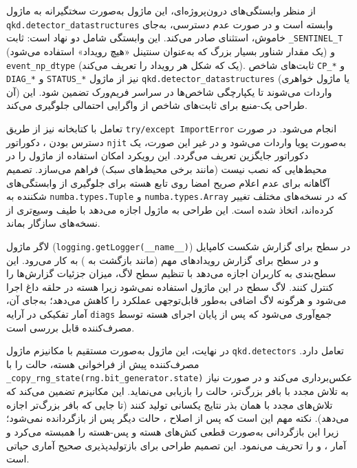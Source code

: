 از منظر وابستگی‌های درون‌پروژه‌ای، این ماژول به‌صورت سختگیرانه به ماژول \texttt{qkd.detector\_datastructures} وابسته است و در صورت عدم دسترسی، به‌جای  خاموش، استثنای  صادر می‌کند. این وابستگی شامل دو نهاد است: ثابت \texttt{\_SENTINEL\_T} (یک مقدار شناور بسیار بزرگ که به‌عنوان سنتینل «هیچ رویداد» استفاده می‌شود) و \texttt{event\_np\_dtype} (یک  که شکل هر رویداد را تعریف می‌کند). ثابت‌های شاخص \texttt{CP\_*} و \texttt{DIAG\_*} و \texttt{STATUS\_*} نیز از ماژول \texttt{qkd.detector\_datastructures} (یا ماژول خواهری آن) واردات می‌شوند تا یکپارچگی شاخص‌ها در سراسر فریم‌ورک تضمین شود. این طراحی یک-منبع  برای ثابت‌های شاخص از واگرایی احتمالی جلوگیری می‌کند.

تعامل با کتابخانه  نیز از طریق \texttt{try/except ImportError} انجام می‌شود. در صورت دسترس بودن ، دکوراتور \texttt{njit} به‌صورت پویا واردات می‌شود و در غیر این صورت، یک دکوراتور  جایگزین تعریف می‌گردد. این رویکرد امکان استفاده از ماژول را در محیط‌هایی که  نصب نیست (مانند برخی محیط‌های  سبک) فراهم می‌سازد. تصمیم آگاهانه برای عدم اعلام صریح امضا روی تابع هسته  برای جلوگیری از وابستگی‌های شکننده  به \texttt{numba.types.Tuple} و \texttt{numba.types.Array} که در نسخه‌های مختلف  تغییر کرده‌اند، اتخاذ شده است. این طراحی به ماژول اجازه می‌دهد با طیف وسیع‌تری از نسخه‌های  سازگار بماند.

لاگر ماژول (\texttt{logging.getLogger(\_\_name\_\_)}) در سطح  برای گزارش شکست کامپایل  و در سطح  برای گزارش رویدادهای مهم (مانند بازگشت به ) به کار می‌رود. این سطح‌بندی به کاربران اجازه می‌دهد با تنظیم سطح لاگ، میزان جزئیات گزارش‌ها را کنترل کنند. لاگ سطح  در این ماژول استفاده نمی‌شود زیرا هسته در حلقه داغ اجرا می‌شود و هرگونه لاگ اضافی به‌طور قابل‌توجهی عملکرد را کاهش می‌دهد؛ به‌جای آن، آمار تفکیکی در آرایه \texttt{diags} جمع‌آوری می‌شود که پس از پایان اجرای هسته توسط مصرف‌کننده قابل بررسی است.

در نهایت، این ماژول به‌صورت مستقیم با مکانیزم  ماژول \texttt{qkd.detectors} تعامل دارد. مصرف‌کننده پیش از فراخوانی هسته، حالت  را با \texttt{\_copy\_rng\_state(rng.bit\_generator.state)} عکس‌برداری می‌کند و در صورت نیاز به تلاش مجدد با بافر بزرگ‌تر، حالت را بازیابی می‌نماید. این مکانیزم تضمین می‌کند که تلاش‌های مجدد با همان بذر  نتایج یکسانی تولید کنند (تا جایی که بافر  بزرگ‌تر اجازه می‌دهد). نکته مهم این است که پس از اصلاح ، حالت  دیگر پس از  بازگردانده نمی‌شود؛ زیرا این بازگردانی به‌صورت قطعی کش‌های  هسته و پس-هسته را همبسته می‌کرد و آمار ،  و  را تحریف می‌نمود. این تصمیم طراحی برای بازتولیدپذیری صحیح آماری حیاتی است.


